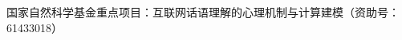 \begin{resume}


  \begin{achievements}

  \item 国家自然科学基金重点项目：互联网话语理解的心理机制与计算建模（资助号：61433018）

  \end{achievements}


\end{resume}
